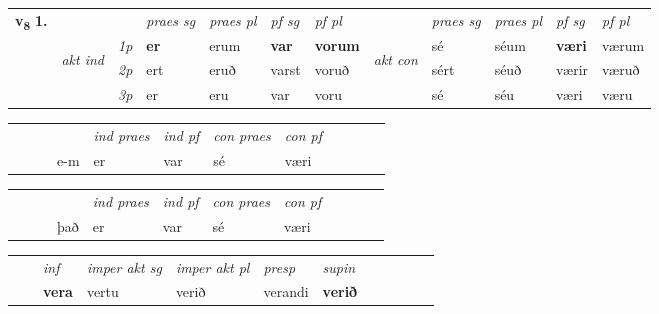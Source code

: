 \begin{tabular}{llllllllllll} \toprule
\multirow{4}{*}{{{\textbf{v{\textsubscript{8}}} \Large{\textbf{1.}}}}}  & &   &  \textit{praes sg}  & \textit{praes pl}  &\textit{ pf sg} & \textit{pf pl} &  &  \textit{praes sg}  & \textit{praes pl}  & \textit{pf sg} & \textit{pf pl } \\*
	\cmidrule{4-7} \cmidrule{9-12}
 & \multirow{3}{*}{\begin{turn}{90}\textit{akt ind}\end{turn}} & {\textit{1p}} & \textbf{er} & erum    & \textbf{var} & \textbf{vorum} & \multirow{3}{*}{\begin{turn}{90}\textit{akt con}\end{turn}} &sé & séum & \textbf{væri} & værum\\*
& &  {\textit{2p}} &  ert  & eruð   & varst & voruð & & sért & séuð & værir & væruð \\*
& &  {\textit{3p}} & er & eru   & var & voru & & sé & séu& væri & væru  \\*
\cmidrule{4-7} \cmidrule{9-12}
\end{tabular}


\begin{tabular}{llllllllllll}
 & &  & &  \textit{ind praes} & \textit{ind pf} & \textit{con praes} & \textit{con pf} \\*
&  & & e-m & er & var & sé & væri \\*
\cmidrule{5-9}
\end{tabular}


\begin{tabular}{llllllllllll}
 & &  & &  \textit{ind praes} & \textit{ind pf} & \textit{con praes} & \textit{con pf} \\*
&  & & það & er & var & sé & væri \\*
\cmidrule{5-9}
\end{tabular}


\begin{tabular}{llllllllllll}
 & & \textit{inf} & \textit{imper akt sg} & \textit{imper akt pl}   & \textit{presp} & \textit{supin}       \\*
  & & \textbf{vera} & vertu  & verið   & verandi &  \textbf{verið}   \\*
\cmidrule{1-12}
\end{tabular}




